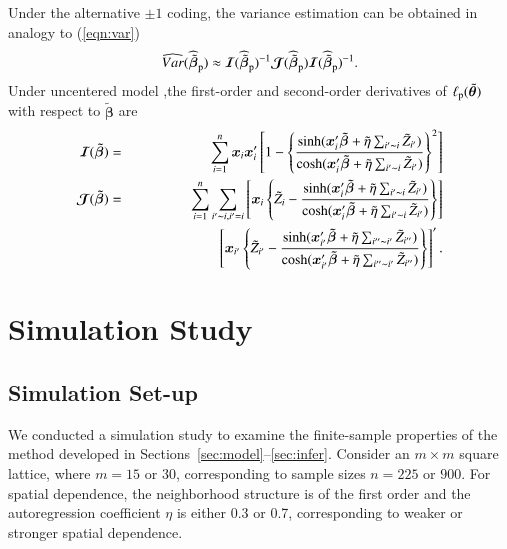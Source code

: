\documentclass[authoryear,review, 11pt]{elsarticle}
\begin{document}
Under the alternative $\pm 1$ coding, the variance estimation can be obtained in analogy to (\ref{eqn:var})
\begin{eqnarray}
\widehat{Var}(\widehat{\tilde{\bm{\beta}}}_{\rm p})\approx\bm{\mathcal{I}}(\widehat{\tilde{\bm{\beta}}}_{\rm p})^{-1}\bm{\mathcal{J}}(\widehat{\tilde{\bm{\beta}}}_{\rm p})\bm{\mathcal{I}}(\widehat{\tilde{\bm{\beta}}}_{\rm p})^{-1}.
\label{eqn:varCenter}
\end{eqnarray}  
Under uncentered model ,the first-order and second-order derivatives of $\ell_{\rm p}(\tilde{\bm{\theta}})$ with respect to $\tilde{\bm{\beta}}$ are
\begin{eqnarray*}
\bm{\mathcal{I}}(\bm{\tilde{\beta}})&=&\sum_{i=1}^n \bm{x}_i\bm{x}_i' \left[1-\left\{\frac{ \sinh({\bm{x}_i'\bm{\tilde{\beta}}+\tilde{\eta}\sum_{i' \thicksim i}\tilde{Z}_{i'}})}{\cosh(\bm{x}_i'\bm{\tilde{\beta}}+\tilde{\eta}\sum_{i' \thicksim i}\tilde{Z}_{i'})}\right\}^2\right]\\
\bm{\mathcal{J}}(\bm{\tilde{\beta}})&=&\sum_{i=1}^n \sum_{i'\thicksim i, i'=i}\left[\bm{x}_i\left\{\tilde{Z}_i-\frac{\sinh({\bm{x}_i'\bm{\tilde{\beta}}+\tilde{\eta}\sum_{i' \thicksim i}\tilde{Z}_{i'}})}{\cosh(\bm{x}_i'\bm{\tilde{\beta}}+\tilde{\eta}\sum_{i' \thicksim i}\tilde{Z}_{i'})}\right\}\right]\\
&&\quad\quad\quad\quad\quad\quad\left[\bm{x}_{i'}\left\{\tilde{Z}_{i'}-\frac{\sinh({\bm{x}_{i'}'\bm{\tilde{\beta}}+\tilde{\eta}\sum_{i'' \thicksim i'}\tilde{Z}_{i''}})}{\cosh(\bm{x}_{i'}'\bm{\tilde{\beta}}+\tilde{\eta}\sum_{i'' \thicksim i'}\tilde{Z}_{i''})}\right\}\right]'.
\end{eqnarray*}

\section{Simulation Study}
\label{sec:simu}

\subsection{Simulation Set-up}

We conducted a simulation study to examine the finite-sample properties of the method developed in Sections~\ref{sec:model}--\ref{sec:infer}.  Consider an $m\times m$ square lattice, where $m=15$ or $30$, corresponding to sample sizes $n=225$ or $900$.  For spatial dependence, the neighborhood structure is of the first order and the autoregression coefficient $\eta$ is either 0.3 or 0.7, corresponding to weaker or stronger spatial dependence. 
\end{document}
